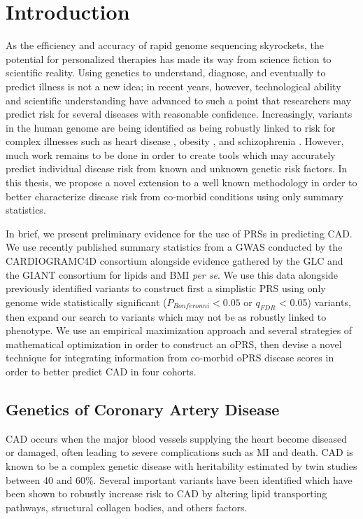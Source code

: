 \chapter{Introduction}
\label{introduction}

As the efficiency and accuracy of rapid genome sequencing skyrockets, the potential for personalized therapies has made its way from science fiction to scientific reality. Using genetics to understand, diagnose, and eventually to predict illness is not a new idea; in recent years, however, technological ability and scientific understanding have advanced to such a point that researchers may predict risk for several diseases with reasonable confidence. Increasingly, variants in the human genome are being identified as being robustly linked to risk for complex illnesses such as heart disease \citep{McPherson2007a}, obesity \citep{Qi2008}, and schizophrenia \citep{Consortium2014}. However, much work remains to be done in order to create tools which may accurately predict individual disease risk from known and unknown genetic risk factors. In this thesis, we propose a novel extension to a well known methodology in order to better characterize disease risk from co-morbid conditions using only summary statistics. 

In brief, we present preliminary evidence for the use of \acp{PRS} in predicting \ac{CAD}. We use recently published summary statistics from a \ac{GWAS} conducted by the \ac{CARDIOGRAMC4D} consortium alongside evidence gathered by the \ac{GLC} and the \ac{GIANT} consortium for lipids and \ac{BMI} \textit{per se}. We use this data alongside previously identified variants to construct first a simplistic \ac{PRS} using only genome wide statistically significant ($P_{Bonferonni} < 0.05$ or $q_{FDR}$ < 0.05) variants, then expand our search to variants which may not be as robustly linked to phenotype. \citep{Storey1995,Dudbridge2013} We use an empirical maximization approach and several strategies of mathematical optimization in order to construct an \ac{oPRS}, then devise a novel technique for integrating information from co-morbid \ac{oPRS} disease scores in order to better predict \ac{CAD} in four cohorts.

\section{Genetics of Coronary Artery Disease}

\ac{CAD} occurs when the major blood vessels supplying the heart become diseased or damaged, often leading to severe complications such as \ac{MI} and death. \citep{McPherson2014} \ac{CAD} is known to be a complex genetic disease with heritability estimated by twin studies between 40 and 60\%. \citep{Vinkhuyzen2013} Several important variants have been identified which have been shown to robustly increase risk to \ac{CAD} by altering lipid transporting pathways, structural collagen bodies, and others factors. \citep{Mega2015,TheCARDIoGRAMplusC4DConsortium2015,Visscher2012,McPherson2016}


